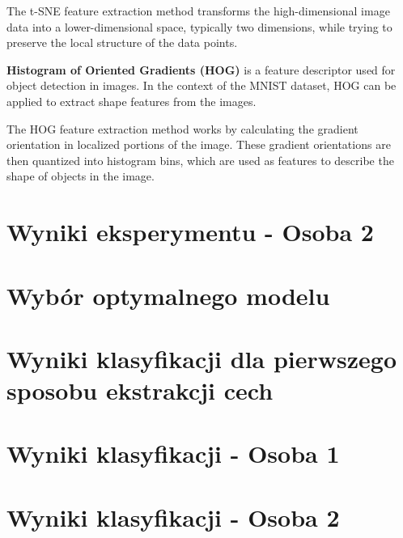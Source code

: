 \documentclass[12pt]{article}
\begin{document}
    The t-SNE feature extraction method transforms the high-dimensional image data into a lower-dimensional space, typically two dimensions, while trying to preserve the local structure of the data points.

    \textbf{Histogram of Oriented Gradients (HOG)} is a feature descriptor used for object detection in images. In the context of the MNIST dataset, HOG can be applied to extract shape features from the images.

    The HOG feature extraction method works by calculating the gradient orientation in localized portions of the image. These gradient orientations are then quantized into histogram bins, which are used as features to describe the shape of objects in the image.

    \pagebreak

    \section{Wyniki eksperymentu - Osoba 2}
    \pagebreak

    \section{Wybór optymalnego modelu}
    \pagebreak

    \section{Wyniki klasyfikacji dla pierwszego sposobu ekstrakcji cech}
    \pagebreak

    \section{Wyniki klasyfikacji - Osoba 1}
    \pagebreak

    \section{Wyniki klasyfikacji - Osoba 2}
    \pagebreak

    \section{}
    \pagebreak
\end{document}
